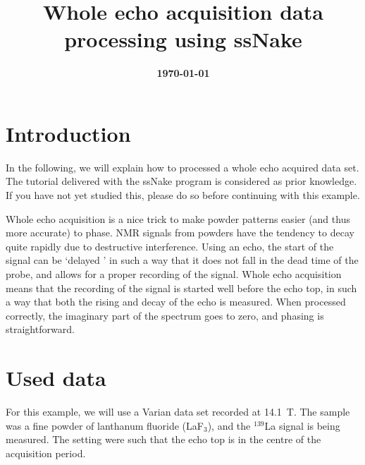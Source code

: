\documentclass[11pt,a4paper]{article}
\title{\color{black}\fontfamily{SourceSansPro-LF}\bfseries Whole echo acquisition data processing using ssNake}
\date{\color{black}\fontfamily{SourceSansPro-LF}\bfseries \today}
\begin{document}


\maketitle

\section{Introduction}
In the following, we will explain how to processed a whole echo acquired data set. The tutorial delivered with the ssNake program is considered as prior knowledge. If you have not yet studied this, please do so before continuing with this example.

Whole echo acquisition is a nice trick to make powder patterns easier (and thus more accurate) to phase. NMR signals from powders have the tendency to decay quite rapidly due to destructive interference. Using an echo, the start of the signal can be `delayed ' in such a way that it does not fall in the dead time of the probe, and allows for a proper recording of the signal. Whole echo acquisition means that the recording of the signal is started well before the echo top, in such a way that both the rising and decay of the echo is measured. When processed correctly, the imaginary part of the spectrum goes to zero, and phasing is straightforward.

\section{Used data}
For this example, we will use a Varian data set recorded at 14.1~T. The sample was a fine powder of lanthanum fluoride (LaF$_3$), and the $^{139}$La signal is being measured. The setting were such that the echo top is in the centre of the acquisition period.
\end{document}
